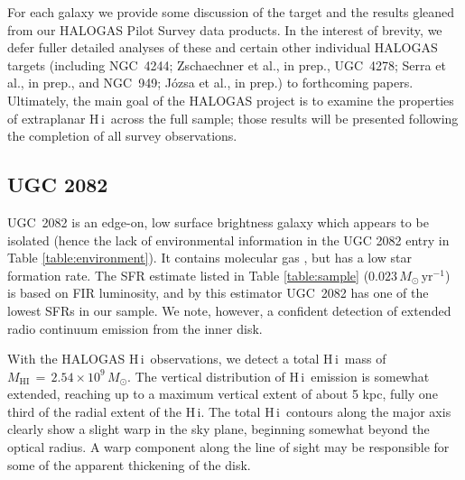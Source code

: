 \documentclass[oldversion]{aa}
\newcommand{\HI}{{\sc H\,i}}
\begin{document}
For each galaxy we provide some discussion of the target and the results gleaned from our HALOGAS Pilot Survey data products. In the interest of brevity, we defer fuller detailed analyses of these and certain other individual HALOGAS targets (including NGC~4244; Zschaechner et al., in prep., UGC~4278; Serra et al., in prep., and NGC~949; J{\'o}zsa et al., in prep.) to forthcoming papers. Ultimately, the main goal of the HALOGAS project is to examine the properties of extraplanar \HI\ across the full sample; those results will be presented following the completion of all survey observations.

\subsection{UGC 2082}\label{subsection:u2082}

UGC~2082 is an edge-on, low surface brightness galaxy which appears to be isolated (hence the lack of environmental information in the UGC 2082 entry in Table \ref{table:environment}). It contains molecular gas \citep{matthews_gao_2001,matthews_etal_2005}, but has a low star formation rate. The SFR estimate listed in Table \ref{table:sample} ($0.023\,M_{\odot}\,\mathrm{yr}^{-1}$) is based on FIR luminosity, and by this estimator UGC~2082 has one of the lowest SFRs in our sample. We note, however, a confident detection of extended radio continuum emission from the inner disk.%

With the HALOGAS \HI\ observations, we detect a total \HI\ mass of $M_{\mathrm{HI}}\,=\,2.54\times10^{9}\,M_\odot$.
The vertical distribution of \HI\ emission is somewhat extended, reaching up to a maximum vertical extent of about 5 kpc, fully one third of the radial extent of the \HI.
The total \HI\ contours along the major axis clearly show a slight warp in the sky plane, beginning somewhat beyond the optical radius. A warp component along the line of sight may be responsible for some of the apparent thickening of the disk.
\end{document}
